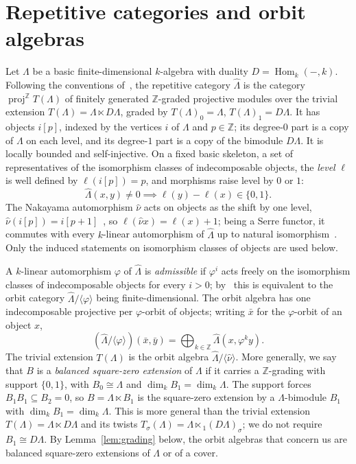 \documentclass[11pt]{amsart}
\theoremstyle{plain}
\theoremstyle{definition}
\DeclareMathOperator{\proj}{proj}
\DeclareMathOperator{\Hom}{Hom}
\newcommand{\rep}{\widehat{\Lambda}}
\newcommand{\Nak}{\widehat{\nu}}
\newcommand{\ZZ}{\mathbb{Z}}
\begin{document}
\section{Repetitive categories and orbit algebras}\label{sec:prelim}

Let $\Lambda$ be a basic finite-dimensional $k$-algebra with duality $D=\Hom_k(-,k)$. Following the
conventions of~\cite{DI}, the repetitive category $\rep$ is the category $\proj^{\ZZ}T(\Lambda)$ of finitely
generated $\ZZ$-graded projective modules over the trivial extension $T(\Lambda)=\Lambda\ltimes D\Lambda$,
graded by $T(\Lambda)_0=\Lambda$, $T(\Lambda)_1=D\Lambda$. It has objects $i[p]$, indexed by the vertices $i$
of $\Lambda$ and $p\in\ZZ$; its degree-$0$ part is a copy of $\Lambda$ on each level, and its degree-$1$ part
is a copy of the bimodule $D\Lambda$. It is locally bounded and self-injective. On a fixed basic skeleton, a
set of representatives of the isomorphism classes of indecomposable objects, the \emph{level} $\ell$ is well
defined by $\ell(i[p])=p$, and morphisms raise level by $0$ or $1$:
\[
  \rep(x,y)\neq 0 \implies \ell(y)-\ell(x)\in\{0,1\}.
\]
The Nakayama automorphism $\Nak$ acts on objects as the shift by one level, $\Nak(i[p])=i[p+1]$~\cite{DI}, so
$\ell(\Nak x)=\ell(x)+1$; being a Serre functor, it commutes with every $k$-linear automorphism of $\rep$ up
to natural isomorphism~\cite[(2.6)]{DI}. Only the induced statements on isomorphism classes of objects are
used below.

A $k$-linear automorphism $\varphi$ of $\rep$ is \emph{admissible} if $\varphi^i$ acts freely on the
isomorphism classes of indecomposable objects for every $i>0$; by~\cite[Lemma~3.4]{DI} this is equivalent to
the orbit category $\rep/\langle\varphi\rangle$ being finite-dimensional. The orbit algebra has one
indecomposable projective per $\varphi$-orbit of objects; writing $\bar x$ for the $\varphi$-orbit of an
object $x$,
\[
  (\rep/\langle\varphi\rangle)(\bar x,\bar y) = \bigoplus_{k\in\ZZ}\rep(x,\varphi^k y).
\]
The trivial extension $T(\Lambda)$ is the orbit algebra $\rep/\langle\Nak\rangle$. More generally, we say that
$B$ is a \emph{balanced square-zero extension} of $\Lambda$ if it carries a $\ZZ$-grading with support
$\{0,1\}$, with $B_0\cong\Lambda$ and $\dim_k B_1=\dim_k\Lambda$. The support forces $B_1 B_1\subseteq B_2=0$,
so $B=\Lambda\ltimes B_1$ is the square-zero extension by a $\Lambda$-bimodule $B_1$ with $\dim_k
B_1=\dim_k\Lambda$. This is more general than the trivial extension $T(\Lambda)=\Lambda\ltimes D\Lambda$ and
its twists $T_\sigma(\Lambda)=\Lambda\ltimes{}_1(D\Lambda)_\sigma$; we do not require $B_1\cong D\Lambda$. By
Lemma~\ref{lem:grading} below, the orbit algebras that concern us are balanced square-zero extensions of
$\Lambda$ or of a cover.
\end{document}
